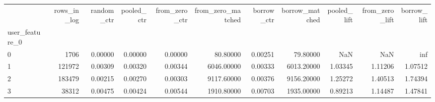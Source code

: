 \begin{tabular}{lrrrrrrrrrr}
\toprule
 & rows\_in\_log & random\_ctr & pooled\_ctr & from\_zero\_ctr & from\_zero\_matched & borrow\_ctr & borrow\_matched & pooled\_lift & from\_zero\_lift & borrow\_lift \\
user\_feature\_0 &  &  &  &  &  &  &  &  &  &  \\
\midrule
0 & 1706 & 0.00000 & 0.00000 & 0.00000 & 80.80000 & 0.00251 & 79.80000 & NaN & NaN & inf \\
1 & 121972 & 0.00309 & 0.00320 & 0.00344 & 6046.00000 & 0.00333 & 6013.20000 & 1.03345 & 1.11206 & 1.07512 \\
2 & 183479 & 0.00215 & 0.00270 & 0.00303 & 9117.60000 & 0.00376 & 9156.20000 & 1.25272 & 1.40513 & 1.74394 \\
3 & 38312 & 0.00475 & 0.00424 & 0.00544 & 1910.80000 & 0.00703 & 1935.00000 & 0.89213 & 1.14487 & 1.47841 \\
\bottomrule
\end{tabular}
